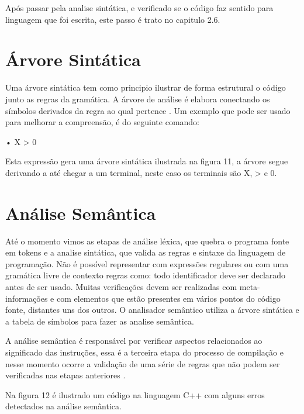 \documentclass[12pt,oneside,a4paper,chapter=TITLE,section=TITLE,sumario=tradicional]{abntex2}
\begin{document}
Após passar pela analise sintática, e verificado se o código faz sentido para linguagem que foi escrita, este passo é trato no capitulo 2.6.

\section{Árvore Sintática}
\label{sec:arvoresintaticafuncadamentação}

Uma árvore sintática tem como principio ilustrar de forma estrutural o código junto as regras da gramática. A árvore de análise é elabora conectando os símbolos derivados da regra ao qual pertence \cite{appel1998}. Um exemplo que pode ser usado para melhorar a compreensão, é do seguinte comando:

•	X > 0

Esta expressão gera uma árvore sintática ilustrada na figura 11, a árvore segue derivando a até chegar a um terminal, neste caso os terminais são X, > e 0.

\begin{figure}[htb]
\end{figure}

\section{Análise Semântica}
\label{sec:analise-semantica}

Até o momento vimos as etapas de análise léxica, que quebra o programa fonte em tokens e a analise sintática, que valida as regras e sintaxe da linguagem de programação. Não é possível representar com expressões regulares ou com uma gramática livre de contexto regras como: todo identificador deve ser declarado antes de ser usado. Muitas verificações devem ser realizadas com meta-informações e com elementos que estão presentes em vários pontos do código fonte, distantes uns dos outros. O analisador semântico utiliza a árvore sintática e a tabela de símbolos para fazer as analise semântica. 

A análise semântica é responsável por verificar aspectos relacionados ao significado das instruções, essa é a terceira etapa do processo de compilação e nesse momento ocorre a validação de uma série de regras que não podem ser verificadas nas etapas anteriores \cite{maragon2015}.

Na figura 12 é ilustrado um código na linguagem C++ com alguns erros detectados na análise semântica.
\end{document}
